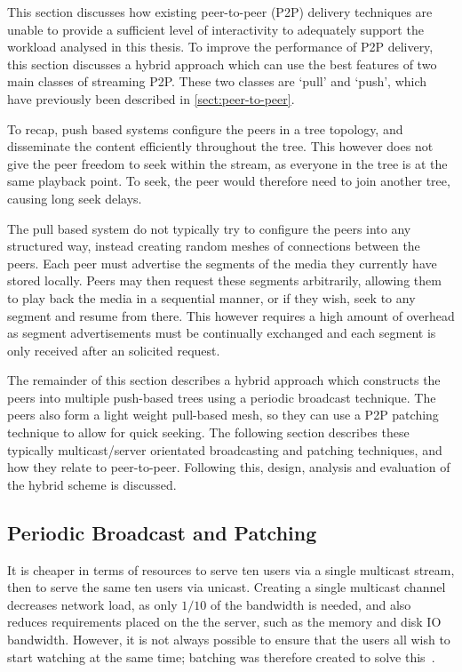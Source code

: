 This section discusses how existing peer-to-peer (P2P) delivery techniques are unable to provide a sufficient level of interactivity to adequately support the workload analysed in this thesis. To improve the performance of P2P delivery, this section discusses a hybrid approach which can use the best features of two main classes of streaming P2P. These two classes are `pull' and `push', which have previously been described in \autoref{sect:peer-to-peer}.

To recap, push based systems configure the peers in a tree topology, and disseminate the content efficiently throughout the tree. This however does not give the peer freedom to seek within the stream, as everyone in the tree is at the same playback point. To seek, the peer would therefore need to join another tree, causing long seek delays.

The pull based system do not typically try to configure the peers into any structured way, instead creating random meshes of connections between the peers. Each peer must advertise the segments of the media they currently have stored locally. Peers may then request these segments arbitrarily, allowing them to play back the media in a sequential manner, or if they wish, seek to any segment and resume from there. This however requires a high amount of overhead as segment advertisements must be continually exchanged and each segment is only received after an solicited request.

The remainder of this section describes a hybrid approach which constructs the peers into multiple push-based trees using a periodic broadcast technique. The peers also form a light weight pull-based mesh, so they can use a P2P patching technique to allow for quick seeking. The following section describes these typically multicast/server orientated broadcasting and patching techniques, and how they relate to peer-to-peer. Following this, design, analysis and evaluation of the hybrid scheme is discussed.

\subsection{Periodic Broadcast and Patching}

    It is cheaper in terms of resources to serve ten users via a single multicast stream, then to serve the same ten users via unicast. Creating a single multicast channel decreases network load, as only $1/10$ of the bandwidth is needed, and also reduces requirements placed on the the server, such as the memory and disk IO bandwidth. However, it is not always possible to ensure that the users all wish to start watching at the same time; batching was therefore created to solve this~\cite{dan1994spf,aggarwal1994apb,viswanathan1996mav,hua1996sba}.

